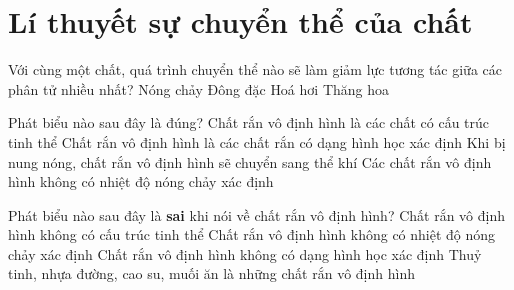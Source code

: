 \section{Lí thuyết sự chuyển thể của chất}




\begin{ex}
	Với cùng một chất, quá trình chuyển thể nào sẽ làm giảm lực tương tác giữa các phân tử nhiều nhất?
	\choice
	{Nóng chảy}
	{Đông đặc}
	{Hoá hơi}
	{\True Thăng hoa}
	\end{ex}



\begin{ex}%
	Phát biểu nào sau đây là đúng?	
	\choice
	{Chất rắn vô định hình là các chất có cấu trúc tinh thể}
	{Chất rắn vô định hình là các chất rắn có dạng hình học xác định}
	{Khi bị nung nóng, chất rắn vô định hình sẽ chuyển sang thể khí}
	{\True Các chất rắn vô định hình không có nhiệt độ nóng chảy xác định}
	\end{ex}

\begin{ex}
	Phát biểu nào sau đây là \textbf{sai} khi nói về chất rắn vô định hình?
	\choice
	{Chất rắn vô định hình không có cấu trúc tinh thể}
	{Chất rắn vô định hình không có nhiệt độ nóng chảy xác định}
	{Chất rắn vô định hình không có dạng hình học xác định}
	{\True Thuỷ tinh, nhựa đường, cao su, muối ăn là những chất rắn vô định hình}
	\end{ex}



